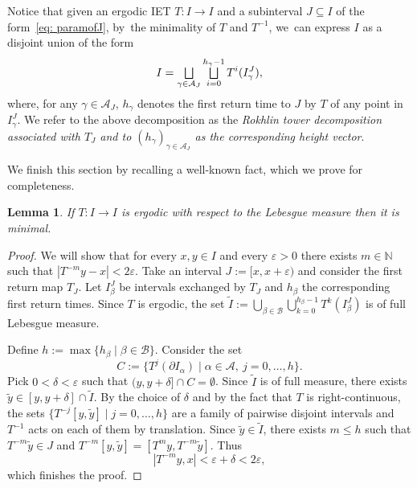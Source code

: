 \documentclass[10pt,a4paper]{amsart}
\let\oldbigsqcup\bigsqcup
\renewcommand{\bigsqcup}{\mathop{\textstyle\oldbigsqcup}\displaylimits}
\let\epsilon\varepsilon
\theoremstyle{plain}
\newtheorem{lemma}[theorem]{Lemma}
\theoremstyle{definition}
\newcommand{\A}{\mathcal{A}}
\newcommand{\N}{\mathbb{N}}
\begin{document}
Notice that given an ergodic IET $T: I \to I$ and a subinterval $J \subseteq I$ of the form~\eqref{eq: paramofJ}, by~the minimality of $T$ and $T^{-1}$, we~can express $I$ as a disjoint union of the form
\begin{equation}
\label{eq:towers_decomposition}
I = \bigsqcup_{\gamma \in \A_J} \bigsqcup_{i = 0}^{h_\gamma - 1} T^i(I_\gamma^J),
\end{equation}
where, for any $\gamma \in \A_J$, $h_\gamma$ denotes the first return time to $J$ by $T$ of any point in $I_\gamma^J$. We refer to the above decomposition as the \emph{Rokhlin tower decomposition associated with $T_J$ and to $(h_{\gamma})_{\gamma\in \A_J}$ as the corresponding \emph{height} vector}.

We finish this section by recalling a well-known fact, which we prove for completeness.

\begin{lemma}\label{lem: minimality}
If $T: I \to I$ is ergodic with respect to the Lebesgue measure then it is minimal.
\end{lemma}

\begin{proof}
We will show that for every $x,y\in I$ and every $\epsilon>0$ there exists $m\in\N$ such that $|T^{-m}y-x|<2\epsilon$. Take an interval $J:=[x,x+\epsilon)$ and consider the first return map $T_J$. Let $I^J_{\beta}$ be intervals exchanged by $T_J$ and $h_{\beta}$ the corresponding first return times. Since $T$ is ergodic, the set $\tilde I:=\bigcup_{\beta\in \mathcal B}\bigcup_{k=0}^{h_{\beta}-1} T^k(I^J_{\beta})$ is of full Lebesgue measure.

Define $h:=\max\{h_{\beta}\mid\beta\in\mathcal B\}$. Consider the set
\[
C:=\{T^{j}(\partial I_{\alpha})\mid \alpha\in\A,\ j=0,\ldots,h\}.
\]
Pick $0<\delta<\epsilon$ such that $(y,y+\delta]\cap C=\emptyset$. Since $\tilde I$ is of full measure, there exists $\tilde y\in[y,y+\delta]\cap \tilde I$. By the choice of $\delta$ and by the fact that $T$ is right-continuous, the sets $\{T^{-j}[y,\tilde y]\mid j=0,\ldots,h\}$ are a family of pairwise disjoint intervals and $T^{-1}$ acts on each of them by translation. Since $\tilde y\in\tilde I$, there exists $m\le h$ such that $T^{-m}\tilde y\in J$ and $T^{-m}[y,\tilde y]=[T^{m}y,T^{-m}\tilde y]$. Thus
\[
|T^{-m}y,x|<\epsilon+\delta<2\epsilon,
\]
which finishes the proof.
\end{proof}
\end{document}
